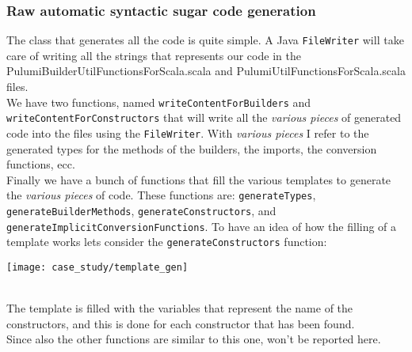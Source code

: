 \subsubsection{Raw automatic syntactic sugar code generation}
The class that generates all the code is quite simple.
A Java \texttt{FileWriter} will take care of writing all the strings that represents our code in the PulumiBuilderUtilFunctionsForScala.scala and PulumiUtilFunctionsForScala.scala files.\\
We have two functions, named \texttt{writeContentForBuilders} and \texttt{writeContentForConstructors} that will write all the \textit{various pieces} of generated code into the files using the \texttt{FileWriter}.
With \textit{various pieces} I refer to the generated types for the methods of the builders, the imports, the conversion functions, ecc.\\
Finally we have a bunch of functions that fill the various templates to generate the \textit{various pieces} of code.
These functions are: \texttt{generateTypes}, \texttt{generateBuilderMethods}, \texttt{generateConstructors}, and \texttt{generateImplicitConversionFunctions}.
To have an idea of how the filling of a template works lets consider the \texttt{generateConstructors} function:
\begin{center}
  \texttt{[image: case\_study/template\_gen]} 
\end{center}\mbox{}\\
The template is filled with the variables that represent the name of the constructors, and this is done for each constructor that has been found.\\
Since also the other functions are similar to this one, won't be reported here.